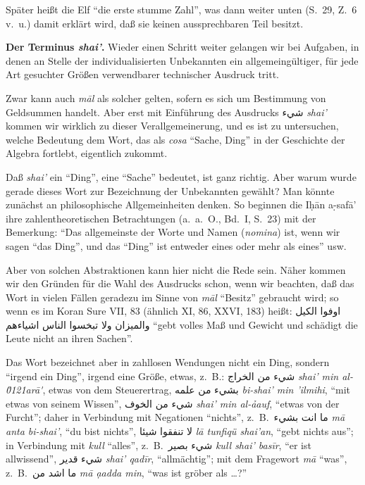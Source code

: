 \documentclass[11pt,a4paper]{article}
\newcommand{\RL}[1]{\beginR#1\endR}
\newcommand{\s}[1]{\d{#1}}     %
\newcommand{\hw}{\d{h}}       %
\newcommand{\ar}[1]{{\arabicfont\RL{#1}}}
\newcommand{\enquote}[1]{``#1''}
\begin{document}
Sp\"ater hei\ss{}t die Elf \enquote{die erste stumme Zahl}, was dann weiter unten (S.\ 29, Z.\ 6 v.\ u.) damit erkl\"art wird, da\ss{} sie keinen aussprechbaren Teil besitzt.

\textbf{Der Terminus \textit{shai'}.} Wieder einen Schritt weiter gelangen wir bei Aufgaben, in denen an Stelle der individualisierten Unbekannten ein allgemeing\"ultiger, f\"ur jede Art gesuchter Gr\"o\ss{}en verwendbarer technischer Ausdruck tritt.

Zwar kann auch \textit{m\=al} als solcher gelten, sofern es sich um Bestimmung von Geldsummen handelt. Aber erst mit Einf\"uhrung des Ausdrucks \ar{شيء} \textit{shai'} kommen wir wirklich zu dieser Verallgemeinerung, und es ist zu untersuchen, welche Bedeutung dem Wort, das als \textit{cosa} \enquote{Sache, Ding} in der Geschichte der Algebra fortlebt, eigentlich zukommt.

Da\ss{} \textit{shai'} ein \enquote{Ding}, eine \enquote{Sache} bedeutet, ist ganz richtig. Aber warum wurde gerade dieses Wort zur Bezeichnung der Unbekannten gew\"ahlt? Man k\"onnte zun\"achst an philosophische Allgemeinheiten denken. So beginnen die I\hw{}\=an a\s-s{}af\=a' ihre zahlentheoretischen Betrachtungen (a.\ a.\ O., Bd.\ I, S.\ 23) mit der Bemerkung: \enquote{Das allgemeinste der Worte und Namen (\textit{nomina}) ist, wenn wir sagen \enquote{das Ding}, und das \enquote{Ding} ist entweder eines oder mehr als eines} usw.

Aber von solchen Abstraktionen kann hier nicht die Rede sein. N\"aher kommen wir den Gr\"unden f\"ur die Wahl des Ausdrucks schon, wenn wir beachten, da\ss{} das Wort in vielen F\"allen geradezu im Sinne von \textit{m\=al} \enquote{Besitz} gebraucht wird; so wenn es im Koran Sure VII, 83 (\"ahnlich XI, 86, XXVI, 183) hei\ss{}t: \ar{اوفوا الكيل والميزان ولا تبخسوا الناس اشياءهم} \enquote{gebt volles Ma\ss{} und Gewicht und sch\"adigt die Leute nicht an ihren Sachen}.

Das Wort bezeichnet aber in zahllosen Wendungen nicht ein Ding, sondern \enquote{irgend ein Ding}, irgend eine Gr\"o\ss{}e, etwas, z.\ B.: \ar{شيء من الخراج} \textit{shai' min al-\u0121ar\=a\g\'}, etwas von dem Steuerertrag, \ar{بشيء من علمه} \textit{bi-shai' min 'ilmihi}, \enquote{mit etwas von seinem Wissen}, \ar{شيء من الخوف} \textit{shai' min al-\h{a}auf}, \enquote{etwas von der Furcht}; daher in Verbindung mit Negationen \enquote{nichts}, z.\ B.\ \ar{ما انت بشيء} \textit{m\=a anta bi-shai'}, \enquote{du bist nichts}, \ar{لا تنفقوا شيئا} \textit{l\=a tunfiq\"u shai'an}, \enquote{gebt nichts aus}; in Verbindung mit \textit{kull} \enquote{alles}, z.\ B.\ \ar{شيء بصير} \textit{kull shai' bas\={i}r}, \enquote{er ist allwissend}, \ar{شيء قدير} \textit{shai' qad\={i}r}, \enquote{allm\"achtig}; mit dem Fragewort \textit{m\=a} \enquote{was}, z.\ B.\ \ar{ما اشد من} \textit{m\=a a\s{}adda min}, \enquote{was ist gr\"ober als \ldots{}?}
\end{document}
